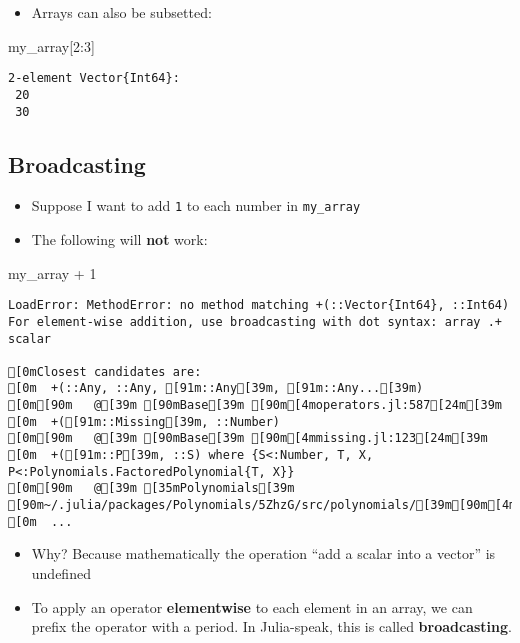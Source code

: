 \documentclass[
  letterpaper,
  DIV=11,
  numbers=noendperiod]{scrartcl}
\newenvironment{Shaded}{\begin{snugshade}}{\end{snugshade}}
\newcommand{\FloatTok}[1]{\textcolor[rgb]{0.68,0.00,0.00}{#1}}
\newcommand{\NormalTok}[1]{\textcolor[rgb]{0.00,0.23,0.31}{#1}}
\newcommand{\OperatorTok}[1]{\textcolor[rgb]{0.37,0.37,0.37}{#1}}
\providecommand{\tightlist}{%
  \setlength{\itemsep}{0pt}\setlength{\parskip}{0pt}}\usepackage{longtable,booktabs,array}
\begin{document}
\begin{itemize}
\tightlist
\item
  Arrays can also be subsetted:
\end{itemize}

\begin{Shaded}
\begin{Highlighting}[]
\NormalTok{my\_array[}\FloatTok{2}\OperatorTok{:}\FloatTok{3}\NormalTok{]}
\end{Highlighting}
\end{Shaded}

\begin{verbatim}
2-element Vector{Int64}:
 20
 30
\end{verbatim}

\subsection{Broadcasting}\label{broadcasting}

\begin{itemize}
\tightlist
\item
  Suppose I want to add \texttt{1} to each number in \texttt{my\_array}
\item
  The following will \textbf{not} work:
\end{itemize}

\begin{Shaded}
\begin{Highlighting}[]
\NormalTok{my\_array }\OperatorTok{+} \FloatTok{1}
\end{Highlighting}
\end{Shaded}

\begin{verbatim}
LoadError: MethodError: no method matching +(::Vector{Int64}, ::Int64)
For element-wise addition, use broadcasting with dot syntax: array .+ scalar

[0mClosest candidates are:
[0m  +(::Any, ::Any, [91m::Any[39m, [91m::Any...[39m)
[0m[90m   @[39m [90mBase[39m [90m[4moperators.jl:587[24m[39m
[0m  +([91m::Missing[39m, ::Number)
[0m[90m   @[39m [90mBase[39m [90m[4mmissing.jl:123[24m[39m
[0m  +([91m::P[39m, ::S) where {S<:Number, T, X, P<:Polynomials.FactoredPolynomial{T, X}}
[0m[90m   @[39m [35mPolynomials[39m [90m~/.julia/packages/Polynomials/5ZhzG/src/polynomials/[39m[90m[4mfactored_polynomial.jl:257[24m[39m
[0m  ...
\end{verbatim}

\begin{itemize}
\tightlist
\item
  Why? Because mathematically the operation ``add a scalar into a
  vector'' is undefined
\item
  To apply an operator \textbf{elementwise} to each element in an array,
  we can prefix the operator with a period. In Julia-speak, this is
  called \textbf{broadcasting}.
\end{itemize}
\end{document}
